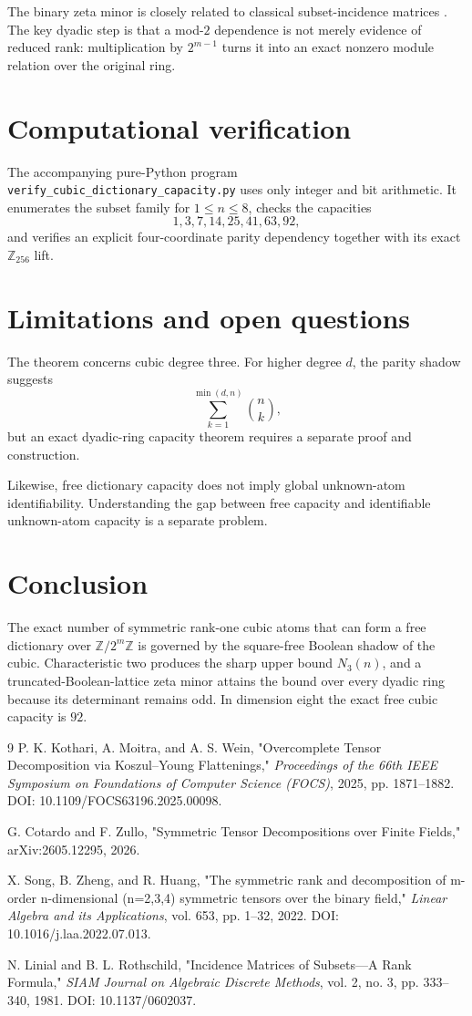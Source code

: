 \documentclass[11pt]{article}
\theoremstyle{definition}
\newcommand{\Z}{\mathbb Z}
\begin{document}
The binary zeta minor is closely related to classical subset-incidence matrices \cite{LinialRothschild1981}. The key dyadic step is that a mod-\(2\) dependence is not merely evidence of reduced rank: multiplication by \(2^{m-1}\) turns it into an exact nonzero module relation over the original ring.

\section{Computational verification}
The accompanying pure-Python program \texttt{verify\_cubic\_dictionary\_capacity.py} uses only integer and bit arithmetic. It enumerates the subset family for \(1\le n\le8\), checks the capacities
\[
1,3,7,14,25,41,63,92,
\]
and verifies an explicit four-coordinate parity dependency together with its exact \(\Z_{256}\) lift.

\section{Limitations and open questions}
The theorem concerns cubic degree three. For higher degree \(d\), the parity shadow suggests
\[
\sum_{k=1}^{\min(d,n)}\binom nk,
\]
but an exact dyadic-ring capacity theorem requires a separate proof and construction.

Likewise, free dictionary capacity does not imply global unknown-atom identifiability. Understanding the gap between free capacity and identifiable unknown-atom capacity is a separate problem.

\section{Conclusion}
The exact number of symmetric rank-one cubic atoms that can form a free dictionary over \(\Z/2^m\Z\) is governed by the square-free Boolean shadow of the cubic. Characteristic two produces the sharp upper bound \(N_3(n)\), and a truncated-Boolean-lattice zeta minor attains the bound over every dyadic ring because its determinant remains odd. In dimension eight the exact free cubic capacity is \(92\).

\begin{thebibliography}{9}
P. K. Kothari, A. Moitra, and A. S. Wein,
"Overcomplete Tensor Decomposition via Koszul--Young Flattenings,"
\emph{Proceedings of the 66th IEEE Symposium on Foundations of Computer Science (FOCS)}, 2025, pp. 1871--1882.
DOI: 10.1109/FOCS63196.2025.00098.

G. Cotardo and F. Zullo,
"Symmetric Tensor Decompositions over Finite Fields,"
arXiv:2605.12295, 2026.

X. Song, B. Zheng, and R. Huang,
"The symmetric rank and decomposition of m-order n-dimensional (n=2,3,4) symmetric tensors over the binary field,"
\emph{Linear Algebra and its Applications}, vol. 653, pp. 1--32, 2022.
DOI: 10.1016/j.laa.2022.07.013.

N. Linial and B. L. Rothschild,
"Incidence Matrices of Subsets---A Rank Formula,"
\emph{SIAM Journal on Algebraic Discrete Methods}, vol. 2, no. 3, pp. 333--340, 1981.
DOI: 10.1137/0602037.
\end{thebibliography}
\end{document}
